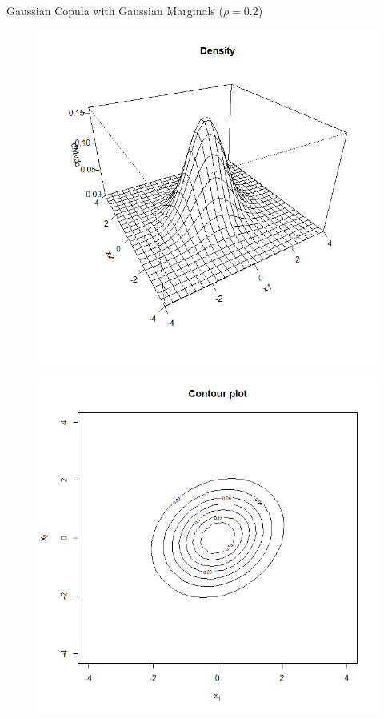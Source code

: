 \documentclass[11pt]{beamer}
\theoremstyle{plain}
\theoremstyle{definition}
\theoremstyle{remark}
\begin{document}
\begin{frame}{Gaussian Copula with Gaussian Marginals ($\rho = 0.2$)}
    \begin{figure}[ht]
        \begin{minipage}[b]{0.45\linewidth}
            \centering
            \includegraphics[width=\textwidth]{fig/gauss_gauss_density_0_2.png}
        \end{minipage}
        \hspace{0.5cm}
        \begin{minipage}[b]{0.45\linewidth}
            \centering
            \includegraphics[width=\textwidth]{fig/gauss_gauss_contour_0_2.png}

\end{minipage}
\end{figure}
\end{frame}
\end{document}
